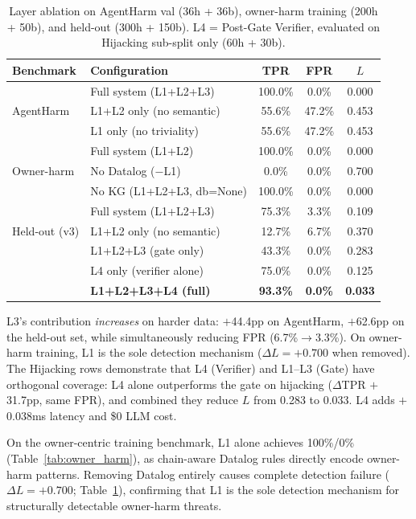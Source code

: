 \documentclass[conference]{IEEEtran}
\begin{document}
\begin{table}[t]
\centering
\caption{Layer ablation on AgentHarm val (36h + 36b), owner-harm training (200h + 50b), and held-out (300h + 150b). L4 = Post-Gate Verifier, evaluated on Hijacking sub-split only (60h + 30b).}
\label{tab:ablation_layers}
\begin{tabular}{llccc}
\toprule
\textbf{Benchmark} & \textbf{Configuration} & \textbf{TPR} & \textbf{FPR} & \textbf{$L$} \\
\midrule
\multirow{3}{*}{AgentHarm}
 & Full system (L1+L2+L3)     & 100.0\% & 0.0\%  & 0.000 \\
 & L1+L2 only (no semantic)   & 55.6\%  & 47.2\% & 0.453 \\
 & L1 only (no triviality)    & 55.6\%  & 47.2\% & 0.453 \\
\midrule
\multirow{3}{*}{Owner-harm}
 & Full system (L1+L2)        & 100.0\% & 0.0\%  & 0.000 \\
 & No Datalog ($-$L1)         & 0.0\%   & 0.0\%  & 0.700 \\
 & No KG (L1+L2+L3, db=None) & 100.0\% & 0.0\%  & 0.000 \\
\midrule
\multirow{3}{*}{Held-out (v3)}
 & Full system (L1+L2+L3)     & 75.3\%  & 3.3\%  & 0.109 \\
 & L1+L2 only (no semantic)   & 12.7\%  & 6.7\%  & 0.370 \\
\midrule
\multirow{3}{*}{Hijacking (v3)}
 & L1+L2+L3 (gate only)       & 43.3\%  & 0.0\%  & 0.283 \\
 & L4 only (verifier alone)   & 75.0\%  & 0.0\%  & 0.125 \\
 & \textbf{L1+L2+L3+L4 (full)} & \textbf{93.3\%} & \textbf{0.0\%} & \textbf{0.033} \\
\bottomrule
\end{tabular}
\vspace{0.5em}
\small L3's contribution \emph{increases} on harder data: $+$44.4pp on AgentHarm, $+$62.6pp on the held-out set, while simultaneously reducing FPR (6.7\%$\to$3.3\%). On owner-harm training, L1 is the sole detection mechanism ($\Delta L = +0.700$ when removed). The Hijacking rows demonstrate that L4 (Verifier) and L1--L3 (Gate) have orthogonal coverage: L4 alone outperforms the gate on hijacking ($\Delta$TPR $+$31.7pp, same FPR), and combined they reduce $L$ from 0.283 to 0.033. L4 adds $+$0.038ms latency and \$0 LLM cost.
\end{table}

On the owner-centric training benchmark, L1 alone achieves 100\%/0\% (Table~\ref{tab:owner_harm}), as chain-aware Datalog rules directly encode owner-harm patterns. Removing Datalog entirely causes complete detection failure ($\Delta L = +0.700$; Table~\ref{tab:ablation_layers}), confirming that L1 is the sole detection mechanism for structurally detectable owner-harm threats.
\end{document}
